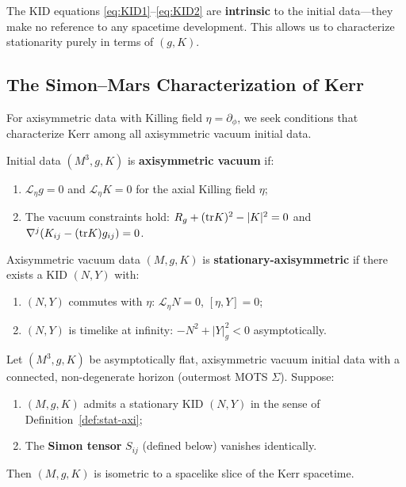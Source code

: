 The KID equations \eqref{eq:KID1}--\eqref{eq:KID2} are \textbf{intrinsic} to the initial data---they make no reference to any spacetime development. This allows us to characterize stationarity purely in terms of $(g, K)$.

\subsection{The Simon--Mars Characterization of Kerr}

For axisymmetric data with Killing field $\eta = \partial_\phi$, we seek conditions that characterize Kerr among all axisymmetric vacuum initial data.

\begin{definition}\label{def:axi-vacuum}
Initial data $(M^3, g, K)$ is \textbf{axisymmetric vacuum} if:
\begin{enumerate}
    \item $\mathcal{L}_\eta g = 0$ and $\mathcal{L}_\eta K = 0$ for the axial Killing field $\eta$;
    \item The vacuum constraints hold: $R_g + (\mathrm{tr} K)^2 - |K|^2 = 0$ and $\nabla^j(K_{ij} - (\mathrm{tr} K)g_{ij}) = 0$.
\end{enumerate}
\end{definition}

\begin{definition}\label{def:stat-axi}
Axisymmetric vacuum data $(M, g, K)$ is \textbf{stationary-axisymmetric} if there exists a KID $(N, Y)$ with:
\begin{enumerate}
    \item $(N, Y)$ commutes with $\eta$: $\mathcal{L}_\eta N = 0$, $[\eta, Y] = 0$;
    \item $(N, Y)$ is timelike at infinity: $-N^2 + |Y|^2_g < 0$ asymptotically.
\end{enumerate}
\end{definition}

\begin{theorem}\label{thm:simon-mars-id}
Let $(M^3, g, K)$ be asymptotically flat, axisymmetric vacuum initial data with a connected, non-degenerate horizon (outermost MOTS $\Sigma$). Suppose:
\begin{enumerate}
    \item[(i)] $(M, g, K)$ admits a stationary KID $(N, Y)$ in the sense of Definition~\ref{def:stat-axi};
    \item[(ii)] The \textbf{Simon tensor} $S_{ij}$ (defined below) vanishes identically.
\end{enumerate}
Then $(M, g, K)$ is isometric to a spacelike slice of the Kerr spacetime.
\end{theorem}

